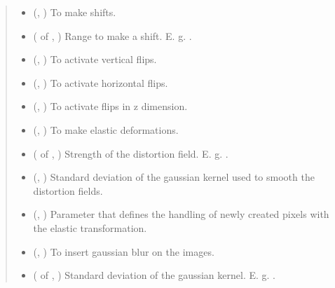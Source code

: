 \documentclass[letterpaper,10pt,english]{sphinxmanual}
\begin{document}
\begin{fulllineitems}
\begin{quote}
\begin{description}
\begin{itemize}
\item {} 
 (, ) \textendash{} To make shifts.

\item {} 
 ( of , ) \textendash{} Range to make a shift. E. g. .

\item {} 
 (, ) \textendash{} To activate vertical flips.

\item {} 
 (, ) \textendash{} To activate horizontal flips.

\item {} 
 (, ) \textendash{} To activate flips in z dimension.

\item {} 
 (, ) \textendash{} To make elastic deformations.

\item {} 
 ( of , ) \textendash{} Strength of the distortion field. E. g. .

\item {} 
 (, ) \textendash{} Standard deviation of the gaussian kernel used to smooth the distortion fields.

\item {} 
 (, ) \textendash{} Parameter that defines the handling of newly created pixels with the elastic transformation.

\item {} 
 (, ) \textendash{} To insert gaussian blur on the images.

\item {} 
 ( of , ) \textendash{} Standard deviation of the gaussian kernel. E. g. .


\end{itemize}
\end{description}
\end{quote}
\end{fulllineitems}
\end{document}
